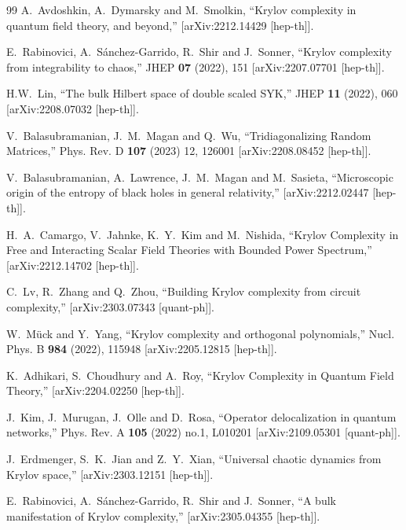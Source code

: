 \documentclass[aps,prl,twocolumn,showpacs,preprintnumbers,amsmath,amssymb]{revtex4-1}
\begin{document}
\begin{thebibliography}{99}
A.~Avdoshkin, A.~Dymarsky and M.~Smolkin,
``Krylov complexity in quantum field theory, and beyond,''
[arXiv:2212.14429 [hep-th]].

E.~Rabinovici, A.~S\'anchez-Garrido, R.~Shir and J.~Sonner,
``Krylov complexity from integrability to chaos,''
JHEP \textbf{07} (2022), 151
[arXiv:2207.07701 [hep-th]].

H.W.~Lin, 
``The bulk Hilbert space of double scaled SYK,''
JHEP \textbf{11} (2022), 060
[arXiv:2208.07032 [hep-th]].

V.~Balasubramanian, J.~M.~Magan and Q.~Wu,
``Tridiagonalizing Random Matrices,''
Phys. Rev. D \textbf{107} (2023) 12, 126001
[arXiv:2208.08452 [hep-th]].

V.~Balasubramanian, A.~Lawrence, J.~M.~Magan and M.~Sasieta,
``Microscopic origin of the entropy of black holes in general relativity,''
[arXiv:2212.02447 [hep-th]].

H.~A.~Camargo, V.~Jahnke, K.~Y.~Kim and M.~Nishida,
``Krylov Complexity in Free and Interacting Scalar Field Theories with Bounded Power Spectrum,''
[arXiv:2212.14702 [hep-th]].

C.~Lv, R.~Zhang and Q.~Zhou,
``Building Krylov complexity from circuit complexity,''
[arXiv:2303.07343 [quant-ph]].

W.~M\"uck and Y.~Yang,
``Krylov complexity and orthogonal polynomials,''
Nucl. Phys. B \textbf{984} (2022), 115948
[arXiv:2205.12815 [hep-th]].

K.~Adhikari, S.~Choudhury and A.~Roy,
``Krylov Complexity in Quantum Field Theory,''
[arXiv:2204.02250 [hep-th]].

J.~Kim, J.~Murugan, J.~Olle and D.~Rosa,
``Operator delocalization in quantum networks,''
Phys. Rev. A \textbf{105} (2022) no.1, L010201
[arXiv:2109.05301 [quant-ph]].

J.~Erdmenger, S.~K.~Jian and Z.~Y.~Xian,
``Universal chaotic dynamics from Krylov space,''
[arXiv:2303.12151 [hep-th]].

E.~Rabinovici, A.~S\'anchez-Garrido, R.~Shir and J.~Sonner,
``A bulk manifestation of Krylov complexity,''
[arXiv:2305.04355 [hep-th]].


\end{thebibliography}
\end{document}
